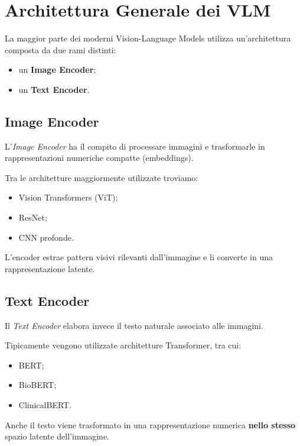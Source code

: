 \section{Architettura Generale dei VLM}

La maggior parte dei moderni Vision-Language Models utilizza un'architettura composta da due rami distinti:

\begin{itemize}
    \item un \textbf{Image Encoder};
    \item un \textbf{Text Encoder}.
\end{itemize}

\subsection{Image Encoder}

L'\textit{Image Encoder} ha il compito di processare immagini e trasformarle in rappresentazioni numeriche compatte (embeddings).

Tra le architetture maggiormente utilizzate troviamo:

\begin{itemize}
    \item Vision Transformers (ViT);
    \item ResNet;
    \item CNN profonde.
\end{itemize}

L'encoder estrae pattern visivi rilevanti dall'immagine e li converte in una rappresentazione latente.

\subsection{Text Encoder}

Il \textit{Text Encoder} elabora invece il testo naturale associato alle immagini.

Tipicamente vengono utilizzate architetture Transformer, tra cui:

\begin{itemize}
    \item BERT;
    \item BioBERT;
    \item ClinicalBERT.
\end{itemize}

Anche il testo viene trasformato in una rappresentazione numerica \textbf{nello stesso} spazio latente dell'immagine.

